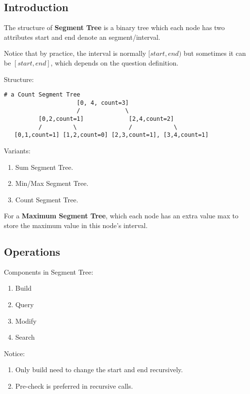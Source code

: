 \subsection{Introduction}
The structure of \textbf{Segment Tree} is a binary tree which each node has two attributes start and end denote an segment/interval. 

Notice that by practice, the interval is normally $[start, end)$ but sometimes it can be $[start, end]$, which depends on the question definition. 

Structure:  
\begin{lstlisting}[columns=flexible]
# a Count Segment Tree
                     [0, 4, count=3]
                     /             \
          [0,2,count=1]             [2,4,count=2]
          /         \               /            \
   [0,1,count=1] [1,2,count=0] [2,3,count=1], [3,4,count=1]
\end{lstlisting}

Variants:
\begin{enumerate}
\item Sum Segment Tree.
\item Min/Max Segment Tree.
\item Count Segment Tree. 
\end{enumerate}

For a \textbf{Maximum Segment Tree}, which each node has an extra value max
to store the maximum value in this node's interval.

\subsection{Operations}
Components in Segment Tree:
\begin{enumerate}
\item Build
\item Query 
\item Modify
\item Search 
\end{enumerate}
Notice:
\begin{enumerate}
\item Only build need to change the start and end recursively.
\item Pre-check is preferred in recursive calls.
\end{enumerate}


